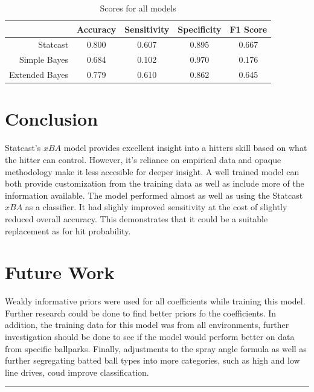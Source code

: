 \documentclass[12pt,letterpaper]{article}
\begin{document}
\begin{table}[!htb]
    \centering
    \begin{tabular}{|r|c|c|c|c|}
        \hline
        & Accuracy & Sensitivity & Specificity & F1 Score \\ \hline
        Statcast & 0.800 & 0.607 & 0.895 & 0.667 \\ \hline
        Simple Bayes & 0.684 & 0.102 & 0.970 & 0.176 \\ \hline
        Extended Bayes & 0.779 & 0.610 & 0.862 & 0.645 \\ \hline
    \end{tabular}
    \caption{Scores for all models}
    \label{tab:results_acc}
\end{table}

\section*{Conclusion}

Statcast's $xBA$ model provides excellent insight into a hitters skill based on what the hitter can control. However, it's reliance on empirical data and opaque methodology make it less accesible for deeper insight. A well trained model can both provide customization from the training data as well as include more of the information available. The model performed almost as well as using the Statcast $xBA$ as a classifier. It had slighly improved sensitivity at the cost of slightly reduced overall accuracy. This demonstrates that it could be a suitable replacement as for hit probability.

\section*{Future Work}

Weakly informative priors were used for all coefficients while training this model. Further research could be done to find better priors fo the coefficients. In addition, the training data for this model was from all environments, further investigation should be done to see if the model would perform better on data from specific ballparks. Finally, adjustments to the spray angle formula as well as further segregating batted ball types into more categories, such as high and low line drives, coud improve classification.

\noindent\rule{\textwidth}{1pt}
\printendnotes
\end{document}
